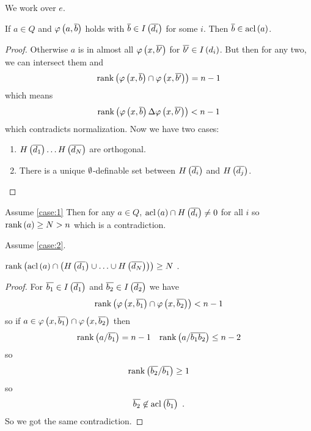 \documentclass{amsart}
\begin{document}
We work over $e$.

\begin{clm}
If $a\in Q$ and $\varphi\left(a, \overline{b}\right)$ holds with $\overline{b}\in
I\left(\overline{d_i}\right)$ for some $i$. Then $\overline{b}\in \operatorname{acl}\left(a\right)$.
\end{clm}

\begin{proof}
Otherwise $a$ is in almost all $\varphi\left(x , \overline{b'}\right)$ for $\overline{b'}\in
I\left(d_i\right)$. But then for any two, we can intersect them and
\begin{equation}
\operatorname{rank}\left(\varphi\left(x , \overline{b}\right) \cap \varphi\left(x , \overline{b'}\right)\right) = n
- 1
\end{equation}
which means
\begin{equation}
\operatorname{rank}\left(\varphi\left(x , \overline{b}\right) \Delta \varphi\left(x , \overline{b'}\right)\right) <
n-1
\end{equation}
which contradicts normalization.
Now we have two cases:
\begin{enumerate}[label = case \numbers.]
\item $H\left(\overline{d_1}\right) \ldots H\left(\overline{d_N}\right)$ are orthogonal.
\label{case:1}

\item There is a unique $\emptyset$-definable set between $H\left(\overline{d_i}\right)$ and
$H\left(\overline{d_j}\right)$. 
\label{case:2}
\end{enumerate}
\end{proof}

Assume \ref{case:1}
Then for any $a\in Q$, $\operatorname{acl}\left(a\right)\cap H\left(\overline{d_i}\right)\neq 0$ for all
$i$ so $\operatorname{rank}\left(a\right) \geq N > n$ which is a contradiction.

Assume \ref{case:2}. 
\begin{clm}
$\operatorname{rank}\left(\operatorname{acl}\left(a\right)\cap \left(H\left(\overline{d_1}\right)\cup \ldots \cup
H\left(\overline{d_N}\right)\right)\right)\geq N$ .
\end{clm}

\begin{proof}
For $\overline{b_1} \in I\left(\overline{d_1}\right)$ and $\overline{b_2}\in I\left(\overline{d_2}\right)$ we have
\begin{equation}
\operatorname{rank}\left(\varphi\left(x , \overline{b_1}\right)\cap \varphi\left(x , \overline{b_2}\right)\right)<
n-1
\end{equation}
so if $a\in \varphi\left(x , \overline{b_1}\right)\cap \varphi\left(x , \overline{b_2}\right)$ then 
\begin{align}
\operatorname{rank}\left(a / \overline{b_1}\right) = n-1
&&
\operatorname{rank}\left(a / \overline{b_1}\overline{b_2}\right) \leq n-2
\end{align}
so
\begin{equation}
\operatorname{rank}\left(\overline{b_2} / \overline{b_1}\right)\geq 1
\end{equation}
so
\begin{equation}
\overline{b_2}\not\in \operatorname{acl}\left(\overline{b_1}\right) \ .
\end{equation}
So we got the same contradiction.
\end{proof}
\end{document}
